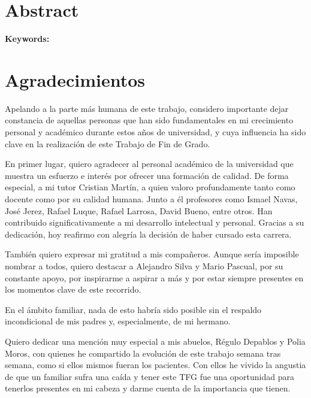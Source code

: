 \documentclass[12pt, a4paper]{article}
\begin{document}





\begin{abstract}
    

	{\bfseries\large Palabras clave:} 

\end{abstract}

\section*{Abstract}

	
	
	{\bfseries\large Keywords:} 

\clearpage
\section*{Agradecimientos}

Apelando a la parte más humana de este trabajo, considero importante dejar constancia de aquellas personas que han sido fundamentales en mi crecimiento personal y acad\'emico durante estos a\~nos de universidad, y cuya influencia ha sido clave en la realizaci\'on de este Trabajo de Fin de Grado.

En primer lugar, quiero agradecer al personal acad\'emico de la universidad que muestra un esfuerzo e interés por ofrecer una formaci\'on de calidad. De forma especial, a mi tutor Cristian Mart\'in, a quien valoro profundamente tanto como docente como por su calidad humana. Junto a \'el profesores como Ismael Navas, Jos\'e Jerez, Rafael Luque, Rafael Larrosa, David Bueno, entre otros. Han contribuido significativamente a mi desarrollo intelectual y personal. Gracias a su dedicaci\'on, hoy reafirmo con alegría la decisi\'on de haber cursado esta carrera.

Tambi\'en quiero expresar mi gratitud a mis compa\~neros. Aunque ser\'ia imposible nombrar a todos, quiero destacar a Alejandro Silva y Mario Pascual, por su constante apoyo, por inspirarme a aspirar a más y por estar siempre presentes en los momentos clave de este recorrido.

En el \'ambito familiar, nada de esto habr\'ia sido posible sin el respaldo incondicional de mis padres y, especialmente, de mi hermano.

Quiero dedicar una menci\'on muy especial a mis abuelos, R\'egulo Depablos y Polia Moros, con quienes he compartido la evoluci\'on de este trabajo semana tras semana, como si ellos mismos fueran los pacientes. Con ellos he vivido la angustia de que un familiar sufra una caída y tener este TFG fue una oportunidad para tenerlos presentes en mi cabeza y darme cuenta de la importancia que tienen.
\end{document}
